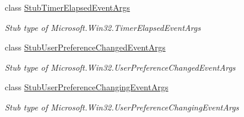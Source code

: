 \begin{DoxyCompactItemize}
class \hyperlink{class_microsoft_1_1_win32_1_1_fakes_1_1_stub_timer_elapsed_event_args}{Stub\-Timer\-Elapsed\-Event\-Args}
\begin{DoxyCompactList}\small\item\em Stub type of Microsoft.\-Win32.\-Timer\-Elapsed\-Event\-Args\end{DoxyCompactList}\item 
class \hyperlink{class_microsoft_1_1_win32_1_1_fakes_1_1_stub_user_preference_changed_event_args}{Stub\-User\-Preference\-Changed\-Event\-Args}
\begin{DoxyCompactList}\small\item\em Stub type of Microsoft.\-Win32.\-User\-Preference\-Changed\-Event\-Args\end{DoxyCompactList}\item 
class \hyperlink{class_microsoft_1_1_win32_1_1_fakes_1_1_stub_user_preference_changing_event_args}{Stub\-User\-Preference\-Changing\-Event\-Args}
\begin{DoxyCompactList}\small\item\em Stub type of Microsoft.\-Win32.\-User\-Preference\-Changing\-Event\-Args\end{DoxyCompactList}\end{DoxyCompactItemize}
